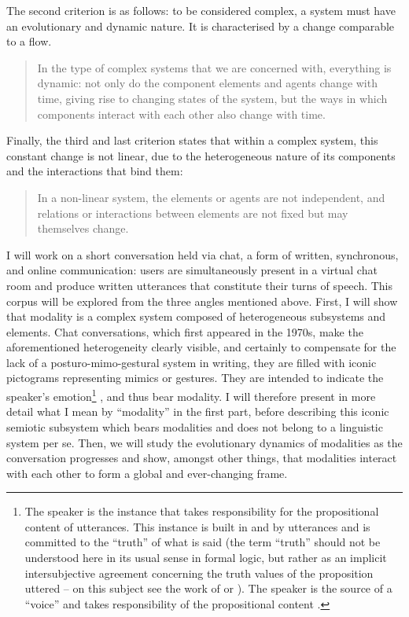 \documentclass[output=paper]{langscibook}
\begin{document}
The second criterion is as follows: to be considered complex, a system must have an evolutionary and dynamic nature. It is characterised by a change comparable to a flow.

\begin{quote}
In the type of complex systems that we are concerned with, everything is dynamic: not only do the component elements and agents change with time, giving rise to changing states of the system, but the ways in which components interact with each other also change with time. \citep[29]{Larsen-FreemanCameron2008}
\end{quote}

Finally, the third and last criterion states that within a complex system, this constant change is not linear, due to the heterogeneous nature of its components and the interactions that bind them: 

\begin{quote}
In a non-linear system, the elements or agents are not independent, and relations or interactions between elements are not fixed but may themselves change. \citep[31]{Larsen-FreemanCameron2008}
\end{quote}

I will work on a short conversation held via chat, a form of written, synchronous, and online communication: users are simultaneously present in a virtual chat room and produce written utterances that constitute their {turns of speech}. This corpus will be explored from the three angles mentioned above. First, I will show that modality is a complex system composed of heterogeneous subsystems and elements. Chat conversations, which first appeared in the 1970s, make the aforementioned heterogeneity clearly visible, and certainly to compensate for the lack of a posturo-mimo-gestural system in writing, they are filled with iconic pictograms representing mimics or gestures. They are intended to indicate the speaker's emotion\footnote{The speaker is the instance that takes responsibility for the propositional content of utterances. This instance is built in and by utterances and is committed to the “truth” of what is said (the term “truth” should not be understood here in its usual sense in formal logic, but rather as an implicit intersubjective agreement concerning the truth values of the proposition uttered -- on this subject see the work of \citealt{Berrendonner1981} or \citealt{Anscombre2005}). The speaker is the source of a “voice” \citep{Perrin2009} and takes responsibility of the propositional content \citep{Rabatel2009}.} , and thus bear modality. I will therefore present in more detail what I mean by “modality” in the first part, before describing this iconic semiotic subsystem which bears modalities and does not belong to a linguistic system per se. Then, we will study the evolutionary dynamics of modalities as the conversation progresses and show, amongst other things, that modalities interact with each other to form a global and ever-changing frame.
\end{document}
